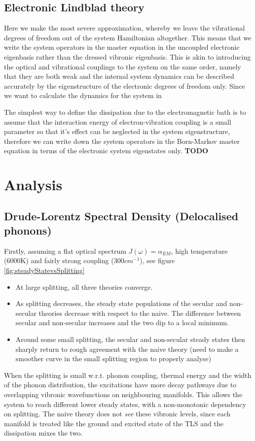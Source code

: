 \documentclass[]{article}
\begin{document}
\subsection{Electronic Lindblad theory}
\label{ssec:electronic}
Here we make the most severe approximation, whereby we leave the vibrational degrees of freedom out of the system Hamiltonian altogether. This means that we write the system operators in the master equation in the uncoupled electronic eigenbasis rather than the dressed vibronic eigenbasis. This is akin to introducing the optical and vibrational couplings to the system on the same order, namely that they are both weak and the internal system dynamics can be described accurately by the eigenstructure of the electronic degrees of freedom only. Since we want to calculate the dynamics for the system in

The simplest way to define the dissipation due to the electromagnetic bath is to assume that the interaction energy of electron-vibration coupling is a small parameter so that it's effect can be neglected in the system eigenstructure, therefore we can write down the system operators in the Born-Markov master equation in terms of the electronic system eigenstates only.
\textbf{TODO}
\section{Analysis}
\subsection{Drude-Lorentz Spectral Density (Delocalised phonons)}
Firstly, assuming a flat optical spectrum $J(\omega) = \alpha_{EM}$, high temperature (6000K) and fairly strong coupling (300$cm^{-1}$), see figure \ref{fig:steadyStatevsSplitting}
\begin{itemize}
	\item At large splitting, all three theories converge.
	\item As splitting decreases, the steady state populations of the secular and non-secular theories decrease with respect to the naive. The difference between secular and non-secular increases and the two dip to a local minimum.
	\item Around some small splitting, the secular and non-secular steady states then sharply return to rough agreement with the naive theory (need to make a smoother curve in the small splitting region to properly analyse)
\end{itemize}
When the splitting is small w.r.t. phonon coupling, thermal energy and the width of the phonon distribution, the excitations have more decay pathways due to overlapping vibronic wavefunctions on neighbouring manifolds. This allows the system to reach different lower steady states, with a non-monotonic dependency on splitting. The naive theory does not \emph{see} these vibronic levels, since each manifold is treated like the ground and excited state of the TLS and the dissipation mixes the two.
\end{document}
